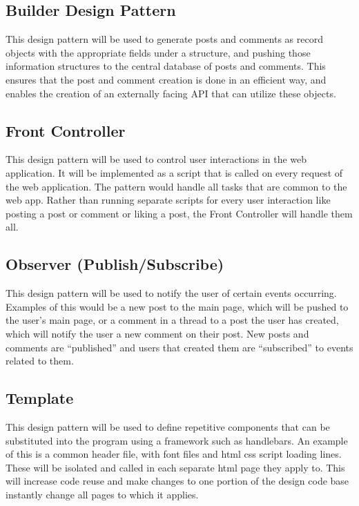 \documentclass[12pt]{article}
\begin{document}
\subsection{Builder Design Pattern}

This design pattern will be used to generate posts and comments as record objects with the appropriate fields under a structure, and pushing those information structures to the central database of posts and comments. This ensures that the post and comment creation is done in an efficient way, and enables the creation of an externally facing API that can utilize these objects.

\subsection{Front Controller}

This design pattern will be used to control user interactions in the web application. It will be implemented as a script that is called on every request of the web application. The pattern would handle all tasks that are common to the web app. Rather than running separate scripts for  every user interaction like posting a post or comment or liking a post, the Front Controller will handle them all.

\subsection{Observer (Publish/Subscribe)}

This design pattern will be used to notify the user of certain events occurring. Examples of this would be a new post to the main page, which will be pushed to the user’s main page, or a comment in a thread to a post the user has created, which will notify the user a new comment on their post. New posts and comments are “published” and users that created them are “subscribed” to events related to them.

\subsection{Template}

This design pattern will be used to define repetitive components that can be substituted into the program using a framework such as handlebars. An example of this is a common header file, with font files and html css script loading lines. These will be isolated and called in each separate html page they apply to. This will increase code reuse and make changes to one portion of the design code base instantly change all pages to which it applies.
\end{document}

